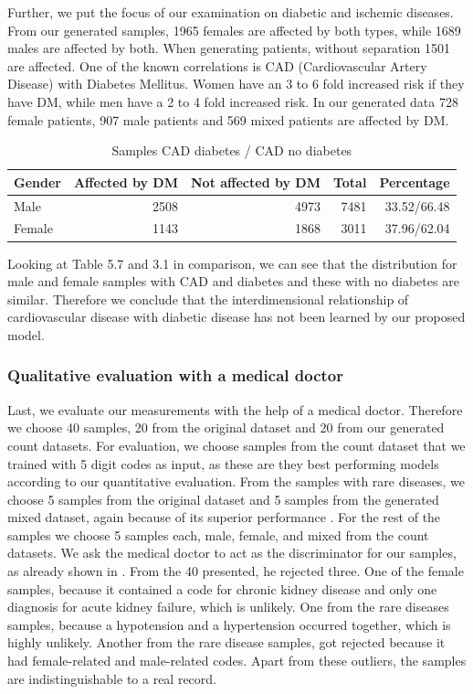 \documentclass[11pt, a4paper]{book}
\begin{document}
Further, we put the focus of our examination on diabetic and ischemic diseases. 
From our generated samples, 1965 females are affected by both types, while 1689 males are affected by both. When generating patients, without separation 1501 are affected.
One of the known correlations is CAD (Cardiovascular Artery Disease) with Diabetes Mellitus. Women have an 3 to 6 fold increased risk if they have DM, while men have a 2 to 4 fold increased risk. \cite{juutilainen2004gender}
In our generated data 728 female patients, 907 male patients and 569 mixed patients are affected by DM.

\begin{table}
\begin{tabularx}{\textwidth}{X|r|r|r|r}
Gender & Affected by DM & Not affected by DM & Total & Percentage\\
\hline
Male 	& 2508 & 4973 & 7481 & 33.52/66.48\\
Female & 1143 & 1868 & 3011 & 37.96/62.04\\
\end{tabularx}
\caption{\label{tab:cad-diabetic-synth}Samples CAD diabetes / CAD no diabetes}
\end{table}

Looking at Table 5.7 and 3.1 in comparison, we can see that the distribution for male and female samples with CAD and diabetes and these with no diabetes are similar. Therefore we conclude that the interdimensional relationship of cardiovascular disease with diabetic disease has not been learned by our proposed model.

\subsubsection{Qualitative evaluation with a medical doctor}
Last, we evaluate our measurements with the help of a medical doctor. Therefore we choose 40 samples, 20 from the original dataset and 20 from our generated count datasets. For evaluation, we choose samples from the count dataset that we trained with 5 digit codes as input, as these are they best performing models according to our quantitative evaluation. From the samples with rare diseases, we choose 5 samples from the original dataset and 5 samples from the generated mixed dataset, again because of its superior performance . For the rest of the samples we choose 5 samples each, male, female, and mixed from the count datasets.
We ask the medical doctor to act as the discriminator for our samples, as already shown in \cite{Choi2017}. From the 40 presented, he rejected three.
One of the female samples, because it contained a code for chronic kidney disease and only one diagnosis for acute kidney failure, which is unlikely. One from the rare diseases samples, because a hypotension and a hypertension occurred together, which is highly unlikely. Another from the rare disease samples, got rejected because it had female-related and male-related codes.
Apart from these outliers, the samples are indistinguishable to a real record.
\end{document}
